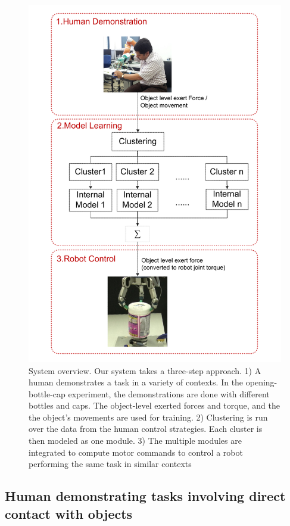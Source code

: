 \begin{figure}
  \centering
   \includegraphics[width=15cm]{./fig_cha4/overview3.pdf}
  \caption{ \scriptsize{System overview. Our system takes a
       three-step approach. 1) A human demonstrates a task in a
       variety of contexts. In the opening-bottle-cap experiment, the
       demonstrations are done with different bottles and caps. The
       object-level exerted forces and torque, and the the object's
       movements are used for training. 2) Clustering is run over the data from the human control
       strategies. Each cluster is then modeled as one module. 3) The
       multiple modules are integrated to compute motor commands to
       control a robot performing the same task in similar contexts}
  \label{fig:overview}
}
\label{fig:demo}
\end{figure}

\subsection{Human demonstrating tasks involving direct contact with objects}
\label{cha4:sec2:demo}


